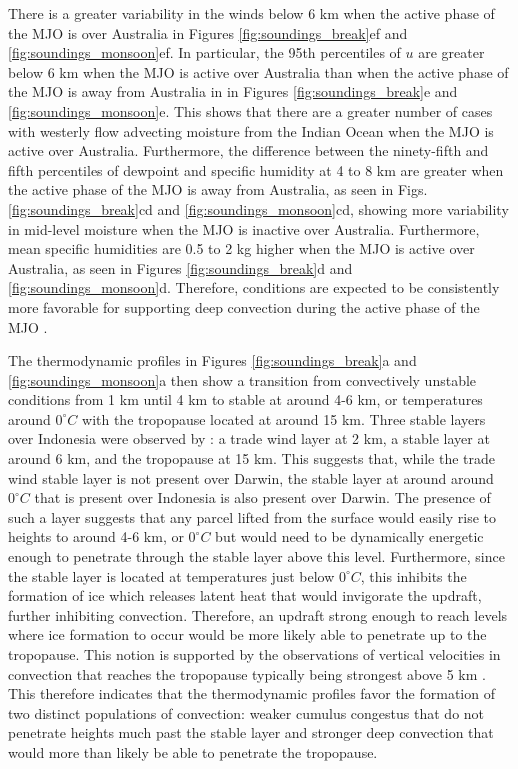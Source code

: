 \documentclass[journal abbreviation, manuscript]{copernicus}
\begin{document}
    There is a greater variability in the winds below 6 km when the active phase of the MJO is over Australia in Figures \ref{fig:soundings_break}ef and \ref{fig:soundings_monsoon}ef. In particular, the 95th percentiles of $u$ are greater below 6 km when the MJO is active over Australia than when the active phase of the MJO is away from Australia in in Figures \ref{fig:soundings_break}e and \ref{fig:soundings_monsoon}e. This shows that there are a greater number of cases with westerly flow advecting moisture from the Indian Ocean when the MJO is active over Australia. Furthermore, the difference between the ninety-fifth and fifth percentiles of dewpoint and specific humidity at 4 to 8 km are greater when the active phase of the MJO is away from Australia, as seen in Figs. \ref{fig:soundings_break}cd and \ref{fig:soundings_monsoon}cd, showing more variability in mid-level moisture when the MJO is inactive over Australia. Furthermore, mean specific humidities are 0.5 to 2 kg higher when the MJO is active over Australia, as seen in Figures \ref{fig:soundings_break}d and \ref{fig:soundings_monsoon}d. Therefore, conditions are expected to be consistently more favorable for supporting deep convection during the active phase of the MJO \citep{Hagosetal2013}.  
    
    The thermodynamic profiles in Figures \ref{fig:soundings_break}a and \ref{fig:soundings_monsoon}a then show a transition from convectively unstable conditions from 1 km until 4 km to stable at around 4-6 km, or temperatures around $0^{\circ} C$ with the tropopause located at around 15 km. Three stable layers over Indonesia were observed by \cite{Johnsonetal1999}: a trade wind layer at 2 km, a stable layer at around 6 km, and the tropopause at 15 km. This suggests that, while the trade wind stable layer is not present over Darwin, the stable layer at around around $0^{\circ} C$ that is present over Indonesia is also present over Darwin. The presence of such a layer suggests that any parcel lifted from the surface would easily rise to heights to around 4-6 km, or $0^{\circ} C$ but would need to be dynamically energetic enough to penetrate through the stable layer above this level. Furthermore, since the stable layer is located at temperatures just below $0^{\circ} C$, this inhibits the formation of ice which releases latent heat that would invigorate the updraft, further inhibiting convection. Therefore, an updraft strong enough to reach levels where ice formation to occur would be more likely able to penetrate up to the tropopause. This notion is supported by the observations of vertical velocities in convection that reaches the tropopause typically being strongest above 5 km \citep{CifelliandRutledge1994, CifelliandRutledge1998, MayandRaj1999, Collisetal2013, Varbleetal2014}. This therefore indicates that the thermodynamic profiles favor the formation of two distinct populations of convection: weaker cumulus congestus that do not penetrate heights much past the stable layer and stronger deep convection that would more than likely be able to penetrate the tropopause.
    
\end{document}
